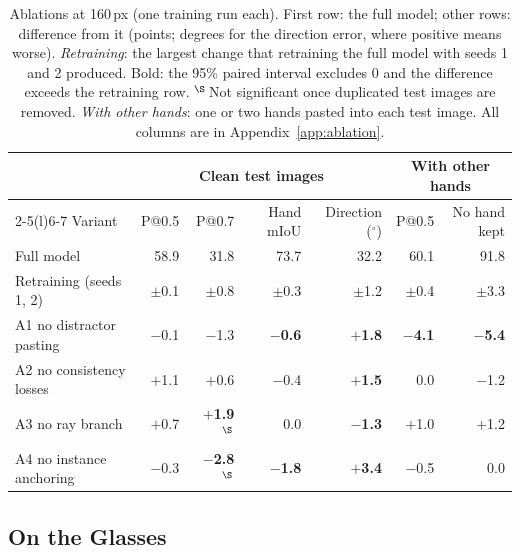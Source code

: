 \begin{table}[t]
  \caption{Ablations at 160\,px (one training run each). First row: the full model; other rows: difference from it (points; degrees for the direction error, where positive means worse). \emph{Retraining}: the largest change that retraining the full model with seeds 1 and 2 produced. Bold: the 95\% paired interval excludes 0 and the difference exceeds the retraining row. $^\S$\,Not significant once duplicated test images are removed. \emph{With other hands}: one or two hands pasted into each test image. All columns are in Appendix~\ref{app:ablation}.}
  \label{tab:ablation}
  \footnotesize
  \setlength{\tabcolsep}{4pt}
  \begin{tabular}{lrrrrrr}
    \toprule
    & \multicolumn{4}{c}{Clean test images} & \multicolumn{2}{c}{With other hands} \\
    \cmidrule(lr){2-5}\cmidrule(l){6-7}
    Variant & P@0.5 & P@0.7 & Hand mIoU & Direction ($^\circ$) & P@0.5 & No hand kept \\
    \midrule
    Full model & 58.9 & 31.8 & 73.7 & 32.2 & 60.1 & 91.8 \\
    \quad Retraining (seeds 1, 2) & $\pm$0.1 & $\pm$0.8 & $\pm$0.3 & $\pm$1.2 & $\pm$0.4 & $\pm$3.3 \\
    \midrule
    A1 no distractor pasting & $-$0.1 & $-$1.3 & \textbf{$-$0.6} & \textbf{$+$1.8} & \textbf{$-$4.1} & \textbf{$-$5.4} \\
    A2 no consistency losses & $+$1.1 & $+$0.6 & $-$0.4 & \textbf{$+$1.5} & 0.0 & $-$1.2 \\
    A3 no ray branch & $+$0.7 & \textbf{$+$1.9}$^\S$ & 0.0 & \textbf{$-$1.3} & $+$1.0 & $+$1.2 \\
    A4 no instance anchoring & $-$0.3 & \textbf{$-$2.8}$^\S$ & \textbf{$-$1.8} & \textbf{$+$3.4} & $-$0.5 & 0.0 \\
    \bottomrule
  \end{tabular}
\end{table}

\subsection{On the Glasses}\label{sec:ondevice}

